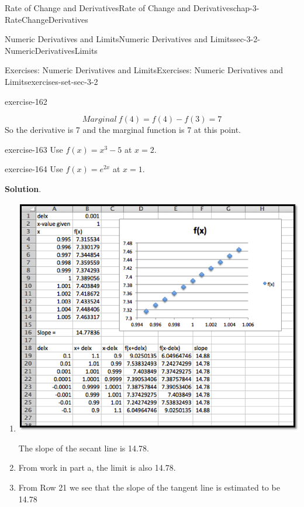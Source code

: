 \documentclass[oneside,10pt,]{book}
\numberwithin{equation}{section}
\begin{document}
\begin{chapterptx}{Rate of Change and Derivatives}{}{Rate of Change and Derivatives}{}{}{chap-3-RateChangeDerivatives}
\begin{sectionptx}{Numeric Derivatives and Limits}{}{Numeric Derivatives and Limits}{}{}{sec-3-2-NumericDerivativesLimits}
\begin{exercises-subsection-numberless}{Exercises: Numeric Derivatives and Limits}{}{Exercises: Numeric Derivatives and Limits}{}{}{exercises-set-sec-3-2}
\begin{exercisegroup}
\begin{divisionexerciseeg}{5}{}{}{exercise-162}
\begin{enumerate}[label=(\alph*)]
\begin{equation*}
Marginal\ f(4)=f(4)-f(3)=7
\end{equation*}
So the derivative is 7 and the marginal function is 7 at this point.%
\end{enumerate}
\end{divisionexerciseeg}%
\begin{divisionexerciseeg}{6}{}{}{exercise-163}%
\hypertarget{p-1084}{}%
Use \(f(x)=x^3-5\) at \(x=2\).%
\end{divisionexerciseeg}%
\begin{divisionexerciseeg}{7}{}{}{exercise-164}%
\hypertarget{p-1085}{}%
Use \(f(x)=e^{2x}\) at \(x=1\).%
\par\smallskip%
\noindent\textbf{Solution}.\hypertarget{solution-81}{}\quad%
\leavevmode%
\begin{enumerate}[label=(\alph*)]
\item\hypertarget{li-333}{}\leavevmode%
\begin{sidebyside}{1}{0.05}{0.05}{0}%
\begin{sbspanel}{0.9}%
\includegraphics[width=1\linewidth]{images/sec3-2-sol7a.png}
\end{sbspanel}%
\end{sidebyside}%
\par
\hypertarget{p-1086}{}%
The slope of the secant line is 14.78.%
\item\hypertarget{li-334}{}\hypertarget{p-1087}{}%
From work in part a, the limit is also 14.78.%
\item\hypertarget{li-335}{}\hypertarget{p-1088}{}%
From Row 21 we see that the slope of the tangent line is estimated to be 14.78%

\end{enumerate}
\end{divisionexerciseeg}
\end{exercisegroup}
\end{exercises-subsection-numberless}
\end{sectionptx}
\end{chapterptx}
\end{document}
